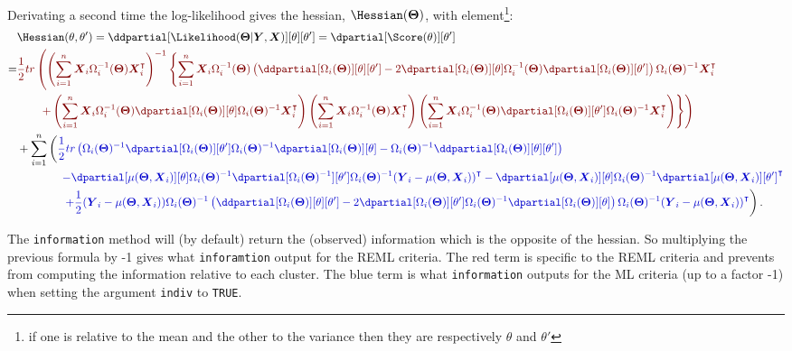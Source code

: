 \documentclass[12pt]{article}
\newcommand{\darkblue}{blue!80!black}
\newcommand{\darkred}{red!50!black}
\newcommand\trans[1]{{#1}^\intercal}%
\newcommand{\param}{\Theta}
\newcommand{\Vparam}{\boldsymbol{\param}}
\newcommand{\VX}{\boldsymbol{X}}
\newcommand{\VY}{\boldsymbol{Y}}
\begin{document}
Derivating a second time the log-likelihood gives the hessian, \(\Hessian(\Vparam)\), with element\footnote{if one is relative to the mean and the other to the variance then they are respectively \(\theta\) and \(\theta'\)}:
\begin{align*}
& \Hessian(\theta,\theta^{\prime}) = \ddpartial[\Likelihood(\Vparam|\VY,\VX)][\theta][\theta^{\prime}] = \dpartial[\Score(\theta)][\theta^{\prime}] \\
=& \textcolor{\darkred}{\frac{1}{2} tr \left( \left(\sum_{i=1}^n \VX_i \Omega_i^{-1}(\Vparam) \trans{\VX}_i\right)^{-1} \left\{ \sum_{i=1}^n \VX_i \Omega_i^{-1}(\Vparam) \left(\ddpartial[\Omega_i(\Vparam)][\theta][\theta^{\prime}] - 2 \dpartial[\Omega_i(\Vparam)][\theta] \Omega_i^{-1}(\Vparam) \dpartial[\Omega_i(\Vparam)][\theta^{\prime}]\right)\Omega_i(\Vparam)^{-1} \trans{\VX}_i \right.  \right.}  \\
& \textcolor{\darkred}{ \left. \left. \qquad + \left(\sum_{i=1}^n \VX_i \Omega_i^{-1}(\Vparam) \dpartial[\Omega_i(\Vparam)][\theta] \Omega_i(\Vparam)^{-1} \trans{\VX}_i\right) \left(\sum_{i=1}^n \VX_i\Omega_i^{-1}(\Vparam) \trans{\VX}_i \right) \left(\sum_{i=1}^n \VX_i \Omega_i^{-1}(\Vparam) \dpartial[\Omega_i(\Vparam)][\theta^{\prime}] \Omega_i(\Vparam)^{-1} \trans{\VX}_i\right) \right\} \right) } \\
& +\sum_{i=1}^n \left( \textcolor{\darkblue}{ \frac{1}{2} tr\left(\Omega_i(\Vparam)^{-1} \dpartial[\Omega_i(\Vparam)][\theta^{\prime}] \Omega_i(\Vparam)^{-1} \dpartial[\Omega_i(\Vparam)][\theta] - \Omega_i(\Vparam)^{-1} \ddpartial[\Omega_i(\Vparam)][\theta][\theta^{\prime}] \right) } \right.\\
& \qquad \qquad \textcolor{\darkblue}{ -  \dpartial[\mu(\Vparam,\VX_i)][\theta] \Omega_i(\Vparam)^{-1} \dpartial[\Omega_i(\Vparam)^{-1}][\theta^{\prime}] \Omega_i(\Vparam)^{-1} \trans{(\VY_i-\mu(\Vparam,\VX_i))} - \dpartial[\mu(\Vparam,\VX_i)][\theta] \Omega_i(\Vparam)^{-1} \trans{\dpartial[\mu(\Vparam,\VX_i)][\theta^{\prime}]} } \\
& \qquad \qquad \left. \textcolor{\darkblue}{ + \frac{1}{2} (\VY_i-\mu(\Vparam,\VX_i)) \Omega_i(\Vparam)^{-1} \left(\ddpartial[\Omega_i(\Vparam)][\theta][\theta^{\prime}] - 2\dpartial[\Omega_i(\Vparam)][\theta^{\prime}] \Omega_i(\Vparam)^{-1} \dpartial[\Omega_i(\Vparam)][\theta] \right) \Omega_i(\Vparam)^{-1} \trans{(\VY_i-\mu(\Vparam,\VX_i))} } \right).
\end{align*}

The \texttt{information} method will (by default) return the (observed)
information which is the opposite of the hessian. So multiplying the
previous formula by -1 gives what \texttt{inforamtion} output for the REML
criteria. The red term is specific to the REML criteria and prevents
from computing the information relative to each cluster. The blue term
is what \texttt{information} outputs for the ML criteria (up to a factor -1)
when setting the argument \texttt{indiv} to \texttt{TRUE}.
\end{document}
